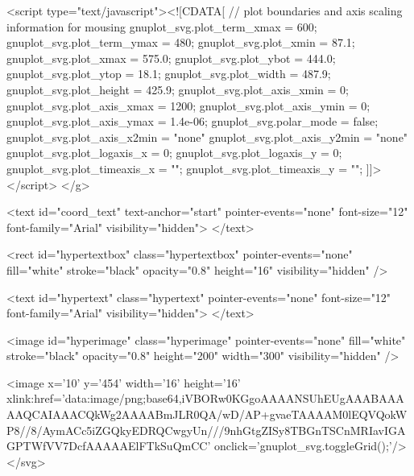 <script type="text/javascript"><![CDATA[
// plot boundaries and axis scaling information for mousing 
gnuplot_svg.plot_term_xmax = 600;
gnuplot_svg.plot_term_ymax = 480;
gnuplot_svg.plot_xmin = 87.1;
gnuplot_svg.plot_xmax = 575.0;
gnuplot_svg.plot_ybot = 444.0;
gnuplot_svg.plot_ytop = 18.1;
gnuplot_svg.plot_width = 487.9;
gnuplot_svg.plot_height = 425.9;
gnuplot_svg.plot_axis_xmin = 0;
gnuplot_svg.plot_axis_xmax = 1200;
gnuplot_svg.plot_axis_ymin = 0;
gnuplot_svg.plot_axis_ymax = 1.4e-06;
gnuplot_svg.polar_mode = false;
gnuplot_svg.plot_axis_x2min = "none"
gnuplot_svg.plot_axis_y2min = "none"
gnuplot_svg.plot_logaxis_x = 0;
gnuplot_svg.plot_logaxis_y = 0;
gnuplot_svg.plot_timeaxis_x = "";
gnuplot_svg.plot_timeaxis_y = "";
]]>
</script>
</g>

  <text id="coord_text" text-anchor="start" pointer-events="none"
  font-size="12" font-family="Arial"
  visibility="hidden"> </text>

  <rect id="hypertextbox" class="hypertextbox" pointer-events="none"
  fill="white" stroke="black" opacity="0.8"
  height="16" visibility="hidden" />

  <text id="hypertext" class="hypertext" pointer-events="none"
  font-size="12" font-family="Arial"
  visibility="hidden"> </text>

  <image id="hyperimage" class="hyperimage" pointer-events="none"
  fill="white" stroke="black" opacity="0.8"
  height="200" width="300" visibility="hidden" />

  <image x='10' y='454' width='16' height='16' 
    xlink:href='data:image/png;base64,iVBORw0KGgoAAAANSUhEUgAAABAAAAAQCAIAAACQkWg2AAAABmJLR0QA/wD/AP+gvaeTAAAAM0lEQVQokWP8//8/AymACc5iZGQkyEDRQCwgyUn///9nhGtgZISy8TBGnTSCnMRIavIGAGPTWfVV7DcfAAAAAElFTkSuQmCC'
    onclick='gnuplot_svg.toggleGrid();'/>
</svg>

